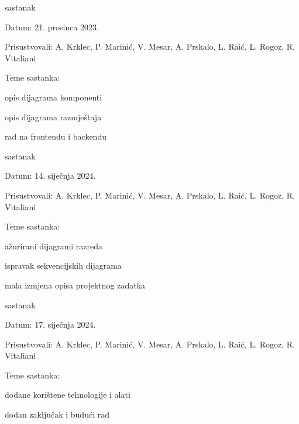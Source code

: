 \begin{packed_enum}
	\item  sastanak
	\item[] \begin{packed_item}
		\item Datum: 21. prosinca 2023.
		\item Prisustvovali: A. Krklec, P. Marinić, V. Mesar, A. Prskalo, L. Raić, L. Rogoz, R. Vitaliani
		\item Teme sastanka:
		\begin{packed_item}
			\item opis dijagrama komponenti
			\item opis dijagrama razmještaja
			\item rad na frontendu i backendu
		\end{packed_item}
	\end{packed_item}

	\item  sastanak
	\item[] \begin{packed_item}
		\item Datum: 14. siječnja 2024.
		\item Prisustvovali: A. Krklec, P. Marinić, V. Mesar, A. Prskalo, L. Raić, L. Rogoz, R. Vitaliani
		\item Teme sastanka:
		\begin{packed_item}
			\item ažurirani dijagrami razreda
			\item ispravak sekvencijskih dijagrama
			\item mala izmjena opisa projektnog zadatka
		\end{packed_item}
	\end{packed_item}
	
	\item  sastanak
	\item[] \begin{packed_item}
		\item Datum: 17. siječnja 2024.
		\item Prisustvovali: A. Krklec, P. Marinić, V. Mesar, A. Prskalo, L. Raić, L. Rogoz, R. Vitaliani
		\item Teme sastanka:
		\begin{packed_item}
			\item dodane korištene tehnologije i alati
			\item dodan zaključak i budući rad
		\end{packed_item}
	\end{packed_item}
	

\end{packed_enum}
